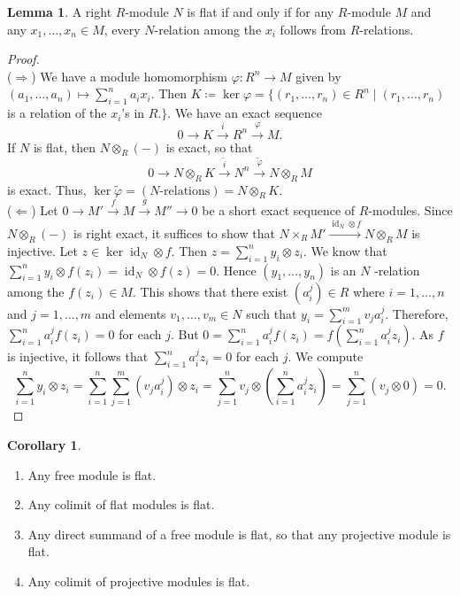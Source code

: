\documentclass[10pt,letterpaper,cm]{nupset}
\theoremstyle{definition}
\theoremstyle{theorem}
\newtheorem{lemma}[definition]{Lemma}
\newtheorem{corollary}[definition]{Corollary}
\theoremstyle{remark}
\newcommand{\1}{\mathbf{1}}
\newcommand{\0}{\vec 0}
\DeclareMathOperator{\id}{id}
\begin{document}
\begin{lemma}
A right $R$-module $N$ is flat if and only if for any $R$-module $M$ and any $x_1, \ldots, x_n \in M$, every $N$-relation among the $x_i$ follows from $R$-relations. 
\end{lemma}
\begin{proof} $ $
\\
($\Longrightarrow$) We have a module homomorphism $\varphi : R^n \to M$ given by $(a_1, \ldots, a_n)\mapsto \sum_{i=1}^na_ix_i$. Then $K\coloneqq  \ker{\varphi}= \{(r_1, \ldots, r_n)\in R^n \mid (r_1, \ldots, r_n)$ is a relation of the $x_i$'s in $R.\}$. We have an exact sequence $$ 0 \to K \overset{i}{\longrightarrow} R^n \overset{\varphi}{\longrightarrow} M  .$$ If $N$ is flat, then $N\otimes_R (-)$ is exact, so that $$ 0 \to N\otimes_R K \overset{\tilde{i}}{\longrightarrow} N^n \overset{\tilde{\varphi}}{\longrightarrow} N\otimes_R M  $$ is exact. Thus, $\ker{\tilde{\varphi}} = (N\text{-relations}) = N\otimes_R K$.
\\ ($\Longleftarrow$) Let $0 \to M' \overset{f}{\longrightarrow}  M  \overset{g}{\longrightarrow} M'' \to 0$ be a short exact sequence of $R$-modules. Since $N \otimes_R (-)$ is right exact, it suffices to show that $N \times_R M' \overset{\id_N \otimes f}{\longrightarrow} N\otimes_RM$ is injective. Let $z\in \ker{\id_N \otimes f}$. Then $z= \sum_{i=1}^n y_i \otimes z_i$. We know that $\sum_{i=1}^n y_i \otimes f(z_i) = \id_N \otimes f(z) =0$. Hence $(y_1, \ldots, y_n)$ is an $N$ -relation among the $f(z_i)\in M$. This shows that there exist $(a_i^j) \in R$ where $i=1, \ldots, n$ and $j=1, \ldots, m$ and elements $v_1, \ldots, v_m \in N$ such that $y_i = \sum_{i=1}^m v_ja_i^j$. Therefore, $\sum_{i=1}^n a_i^jf(z_i) = 0$ for each $j$. But $0 = \sum_{i=1}^n a_i^j f(z_i) = f\left(\sum_{i=1}^n a_i^j z_i \right)$. As $f$ is injective, it follows that $\sum_{i=1}^n a_i^jz_i = 0$ for each $j$. We compute $$\sum_{i=1}^n y_i \otimes z_i = \sum_{i=1}^n \sum_{j=1}^m (v_ja_i^j) \otimes z_i = \sum_{j=1}^n v_j \otimes \left(\sum_{i=1}^n a_i^j z_i \right) = \sum_{j=1}^n (v_j \otimes 0) = 0.$$
\end{proof}

\begin{corollary} $ $
\begin{enumerate}
\item Any free module is flat.
\item Any colimit of flat modules is flat.
\item Any direct summand of a free module is flat, so that any projective module is flat.
\item Any colimit of projective modules is flat. 
\end{enumerate}
\end{corollary}
\end{document}
